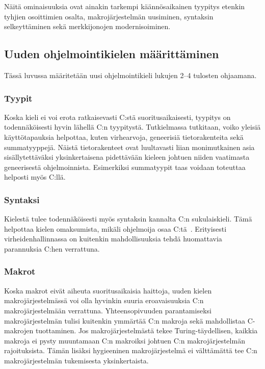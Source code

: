 Näitä ominaisuuksia ovat ainakin tarkempi käännösaikainen tyypitys etenkin
tyhjien osoittimien osalta, makrojärjestelmän uusiminen, syntaksin
selkeyttäminen sekä merkkijonojen modernisoiminen.

\subsection{Uuden ohjelmointikielen määrittäminen}

Tässä luvussa määritetään uusi ohjelmointikieli lukujen 2--4 tulosten
ohjaamana.

\subsubsection{Tyypit}

Koska kieli ei voi erota ratkaisevasti C:stä suoritusaikaisesti, tyypitys on
todennäköisesti hyvin lähellä C:n tyypitystä. Tutkielmassa tutkitaan, voiko
yleisiä käyttötapauksia helpottaa, kuten virhearvoja, geneerisiä
tietorakenteita sekä summatyyppejä. Näistä tietorakenteet ovat luultavasti
liian monimutkainen asia sisällytettäväksi yksinkertaisena pidettävään kieleen
johtuen niiden vaatimasta geneerisestä ohjelmoinnista. Esimerkiksi summatyypit
taas voidaan toteuttaa helposti myös C:llä.

\subsubsection{Syntaksi}

Kielestä tulee todennäköisesti myös syntaksin kannalta C:n sukulaiskieli. Tämä
helpottaa kielen omaksumista, mikäli ohjelmoija osaa
C:tä~\citep{languagelearning}. Erityisesti virheidenhallinnassa on kuitenkin
mahdollisuuksia tehdä huomattavia parannuksia C:hen verrattuna.

\subsubsection{Makrot}

Koska makrot eivät aiheuta suoritusaikaisia haittoja, uuden kielen
makrojärjestelmässä voi olla hyvinkin suuria eroavaisuuksia C:n
makrojärjestelmään verrattuna. Yhteensopivuuden parantamiseksi
makrojärjestelmän tulisi kuitenkin ymmärtää C:n makroja sekä mahdollistaa
C-makrojen tuottaminen. Jos makrojärjestelmästä tekee Turing-täydellisen,
kaikkia makroja ei pysty muuntamaan C:n makroiksi johtuen C:n makrojärjestelmän
rajoituksista. Tämän lisäksi hygieeninen makrojärjestelmä ei välttämättä tee
C:n makrojärjestelmän tukemisesta yksinkertaista.


